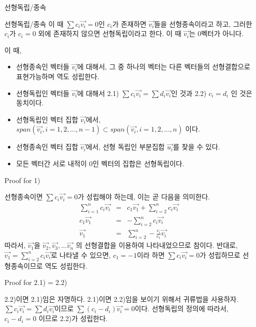 \documentclass{beamer}
\begin{document}
\begin{frame}{선형독립/종속} 
\begin{block}{선형독립/종속}
이 때 $\sum c_i \vec{v_i} = 0$인 $c_i$가 존재하면 $\vec{v_i}$들을 선형종속이라고 하고, 그러한 $c_i$가 $c_i=0$ 외에 존재하지 않으면 선형독립이라고 한다. 이 때 $\vec{v_i}$는 0벡터가 아니다. 
\end{block}
이 때, 
\begin{itemize} 
\item 선형종속인 벡터들 $\vec{v_i}$에 대해서, 그 중 하나의 벡터는 다른 벡터들의 선형결합으로 표현가능하며 역도 성립한다. 
\item 선형독립인 벡터들 $\vec{v_i}$에 대해서 2.1) $\sum c_i\vec{v_i} = \sum d_i\vec{v_i}$인 것과 2.2) $c_i = d_i$ 인 것은 동치이다. 
\item 선형독립인 벡터 집합 $\vec{v_i}$에서, $span(\vec{v_i}, i = 1, 2, ... , n-1) \subset span(\vec{v_i}, i = 1, 2, ... , n) $ 이다.  
\item 선형종속인 벡터 집합 $\vec{v_i}$에서, 선형 독립인 부분집합 $\vec{u_i}$를 찾을 수 있다. 
\item 모든 벡터간 서로 내적이 0인 벡터의 집합은 선형독립이다. 
\end{itemize}
\end{frame}

\begin{frame}{Proof for 1)} 

선형종속이면 $\sum c_i \vec{v_i} = 0$가 성립해야 하는데, 이는 곧 다음을 의미한다. 
\begin{eqnarray} 
\sum^n_{i=1} c_i \vec{v_i} & = & c_1 \vec{v_1} + \sum^n_{i=2} c_i \vec{v_i} \\
c_1 \vec{v_1} &=& - \sum^n_{i=2} c_i \vec{v_i}\\
\vec{v_1} &=& \sum^n_{i=2} -\frac{c_i}{c_1} \vec{v_i}
\end{eqnarray}
따라서, $\vec{v_1}$을 $\vec{v_2}, \vec{v_3}, ... \vec{v_n}$ 의 선형결합을 이용하여 나타내었으므로 참이다. 
반대로, $\vec{v_1} = \sum^n_{i=2} c_i \vec{v_i}$로 나타낼 수 있으면, $c_1=-1$이라 하면 $\sum c_i \vec{v_i} = 0$가 성립하므로 선형종속이므로 역도 성립한다. 

\end{frame}

\begin{frame}{Proof for 2.1) = 2.2)}

2.2)이면 2.1)임은 자명하다. 
2.1)이면 2.2)임을 보이기 위해서 귀류법을 사용하자. $\sum c_i\vec{v_i} = \sum d_i\vec{v_i}$이므로  $\sum (c_i-  d_i) \vec{v_i} = 0$이다. 선형독립의 정의에 따라서, $c_i - d_i=0$ 이므로 2.2)가 성립한다. 

\end{frame}
\end{document}

